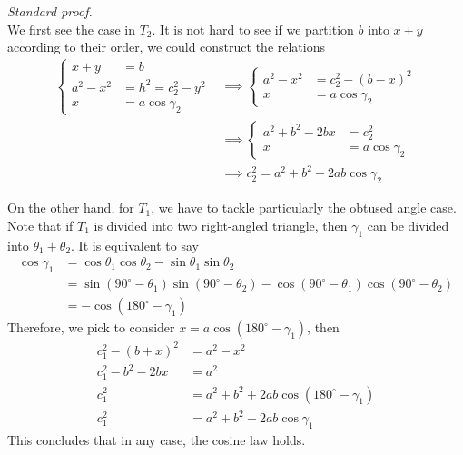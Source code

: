 \documentclass[12pt]{article}
\renewenvironment{proof}[1][Proof]{\begin{snugshade*} \textit{{#1}.}\\}{\hfill \qedsymbol \end{snugshade*}}
\begin{document}
    \begin{proof}[Standard proof]
        We first see the case in $T_2$. It is not hard to see if we partition $b$ into $x+y$ according to their order, we could construct the relations \begin{align*}
            \begin{cases}
                x+y&=b\\
                a^2-x^2&=h^2=c_2^2-y^2\\
                x&=a\cos{\gamma_2}
            \end{cases}
            &\implies \begin{cases}
                a^2-x^2&=c_2^2-(b-x)^2\\
                x&=a\cos{\gamma_2}
            \end{cases}\\
            &\implies \begin{cases}
                a^2+b^2-2bx&=c_2^2\\
                x&=a\cos{\gamma_2}
            \end{cases}\\
            &\implies c_2^2=a^2+b^2-2ab\cos{\gamma_2}
        \end{align*}

        On the other hand, for $T_1$, we have to tackle particularly the obtused angle case. Note that if $T_1$ is divided into two right-angled triangle, then $\gamma_1$ can be divided into $\theta_1+\theta_2$. It is equivalent to say \begin{align*}
            \cos{\gamma_1}&=\cos{\theta_1}\cos{\theta_2}-\sin{\theta_1}\sin{\theta_2}\\
            &=\sin(90^\circ - \theta_1)\sin(90^\circ - \theta_2) - \cos(90^\circ - \theta_1)\cos(90^\circ - \theta_2)\\
            &=-\cos(180^\circ -\gamma_1)
        \end{align*}
        Therefore, we pick to consider $x=a\cos(180^\circ - \gamma_1)$, then \begin{align*}
            c_1^2 - (b+x)^2 &= a^2-x^2\\
            c_1^2 - b^2 - 2bx &= a^2\\
            c_1^2 &= a^2 + b^2 + 2ab\cos(180^\circ - \gamma_1)\\
            c_1^2 &= a^2 + b^2 - 2ab\cos{\gamma_1}
        \end{align*}
        This concludes that in any case, the cosine law holds.
    \end{proof}
\end{document}
